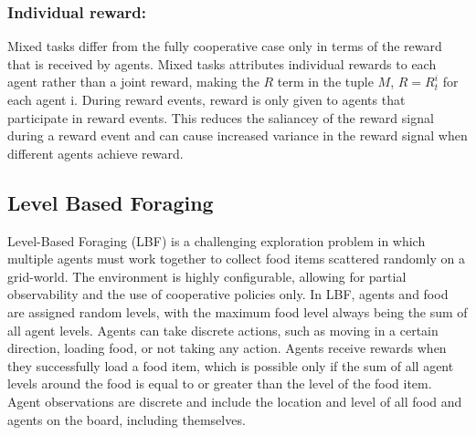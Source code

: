 \documentclass[systems,article,submit,pdftex,moreauthors]{Definitions/mdpi}
\begin{document}
\subsubsection{Individual reward:}
Mixed tasks differ from the fully cooperative case only in terms of the reward that is received by agents. Mixed tasks attributes individual rewards to each agent rather than a joint reward, making the $R$ term in the tuple $M$, $R=R^i_t$ for each agent i. During reward events, reward is only given to agents that participate in reward events. This reduces the saliancey of the reward signal during a reward event and can cause increased variance in the reward signal when different agents achieve reward. 


\subsection{Level Based Foraging}
Level-Based Foraging (LBF) is a challenging exploration problem in which multiple agents must work together to collect food items scattered randomly on a grid-world\cite{LBF}. The environment is highly configurable, allowing for partial observability and the use of cooperative policies only. In LBF, agents and food are assigned random levels, with the maximum food level always being the sum of all agent levels. Agents can take discrete actions, such as moving in a certain direction, loading food, or not taking any action. Agents receive rewards when they successfully load a food item, which is possible only if the sum of all agent levels around the food is equal to or greater than the level of the food item. Agent observations are discrete and include the location and level of all food and agents on the board, including themselves.
\end{document}
